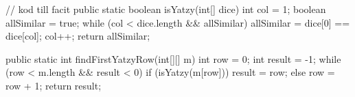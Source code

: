\begin{Code}[language=Java]
// kod till facit
    public static boolean isYatzy(int[] dice){
        int col = 1;
        boolean allSimilar = true;
        while (col < dice.length && allSimilar) {
          allSimilar = dice[0] == dice[col];
          col++;
        }
        return allSimilar;
    }
    
    public static int findFirstYatzyRow(int[][] m){
        int row = 0;
        int result = -1;
        while (row < m.length && result < 0){
            if (isYatzy(m[row])) {
              result = row;
            } else {
              row = row + 1;    
            }
        }
        return result;
    }
\end{Code}



\ExtraTasks %

\Task 

\AdvancedTasks %

\Task     
    